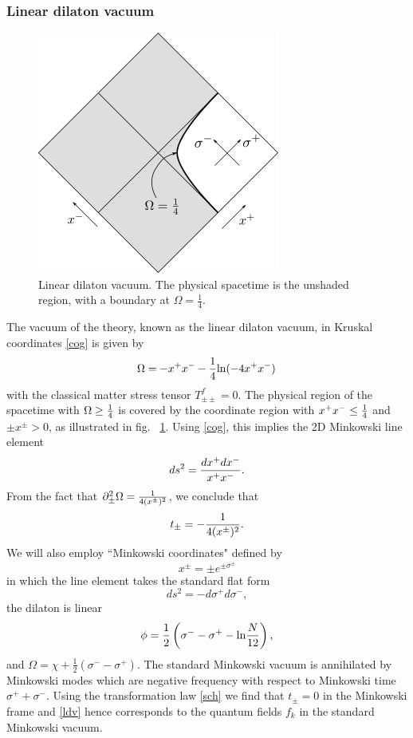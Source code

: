 \documentclass[12pt,oneside,letterpaper]{article}
\newcommand{\p}{\partial}
\newcommand{\f}{\frac}
\newcommand{\be}{\begin{equation}}
\newcommand{\ee}{\end{equation}}
\def\be{\begin{eqnarray}}
\def\ee{\end{eqnarray}}
\let\s=\sigma \let\t=\tau \let\u=\upsilon \let\c=\chi
\let\f=\frac
\def\be{\begin{equation}}
\def\ee{\end{equation}}
\def\log{{\rm ln}}
\renewcommand{\p}{\partial}
\numberwithin{equation}{section}
\def \be {\begin{equation}}
\def \ee {\end{equation}}
\begin{document}
\subsubsection{Linear dilaton vacuum}
\begin{figure}
\begin{center}
\includegraphics[scale=1.0]{figures/vacuum.png}
\end{center}
\caption{\small Linear dilaton vacuum. The physical spacetime is the unshaded region, with a boundary at $\Omega = \frac{1}{4}$.\label{fig:vacuum}}
\end{figure}

The vacuum of the theory, known as the linear dilaton vacuum, in  Kruskal coordinates \eqref{cog} is 
given by 
\be\label{ldv}
\Omega = -  x^+ x^- - \f 1 4 \log(-4  x^+ x^-)\,
\ee
with the classical matter stress tensor $T^f_{\pm\pm}=0$. 
The physical region of the spacetime with $\Omega\ge{1 \over 4}$ is covered by the coordinate region with $x^+x^-\le {1 \over 4}$
and $\pm x^\pm>0$, as illustrated in fig. ~\ref{fig:vacuum}. Using \eqref{cog}, this implies the 2D Minkowski line element 
\be ds^2={dx^+dx^-\over x^+x^-}.\ee  From the fact that $\p_\pm^2\Omega={1 \over 4(x^\pm)^2}$, we conclude that \be t_\pm=-{1 \over 4(x^\pm)^2}.\ee
We will also employ
 ``Minkowski coordinates"  defined by \be x^\pm = \pm e^{\pm \s^\pm}\ee 
 in which the line element takes the standard flat form
 \be
ds^2 = -d\s^+ d\s^-,
\ee 
the dilaton is linear 
\be \phi=\f 1 2 \left(\s^--\s^+-\log \f{N}{12}\right),\ee
and $\Omega=\chi+\f 1 2(\s^--\s^+)$.
The standard Minkowski vacuum is annihilated by Minkowski modes which are negative frequency with respect to Minkowski time $\s^++\s^-$. Using the transformation law \eqref{sch} we find that $t_\pm=0$ in the Minkowski frame and \eqref{ldv} hence corresponds to the quantum fields $f_k$ in the standard Minkowski vacuum. 
\end{document}
